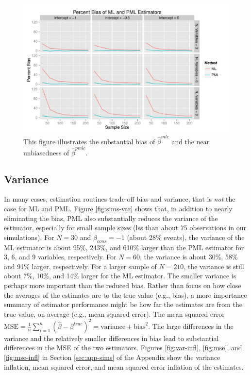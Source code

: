 \documentclass[12pt]{article}
\begin{document}
\begin{figure}[h]
\begin{center}
\includegraphics[width = \textwidth]{figs/sims-percent-bias.pdf}
\caption{This figure illustrates the substantial bias of $\hat{\beta}^{mle}$ and the near unbiasedness of $\hat{\beta}^{pmle}$.}\label{fig:sims-coef-perc-bias}
\end{center}
\end{figure}

\subsection*{Variance}

In many cases, estimation routines trade-off bias and variance, that is \textit{not} the case for ML and PML. 
Figure \ref{fig:sims-var} shows that, in addition to nearly eliminating the bias, PML also substantially reduces the variance of the estimator, especially for small sample sizes (lss than about 75 observations in our simulations). 
For $N = 30$ and $\beta_{cons} = -1$ (about 28\% events), the variance of the ML estimator is about 95\%, 243\%, and 610\% larger than the PML estimator for 3, 6, and 9 variables, respectively. 
For $N = 60$, the variance is about 30\%, 58\% and 91\% larger, respectively. For a larger sample of $N = 210$, the variance is still about 7\%, 10\%, and 14\% larger for the ML estimator. 
The smaller variance is perhaps more important than the reduced bias.
Rather than focus on how close the averages of the estimates are to the true value (e.g., bias), a more importance summary of estimator performance might be how far the estimates are from the true value, on average (e.g., mean squared error).
The mean squared error $\text{MSE} = \frac{1}{n}\sum_{i=1}^n(\hat{\beta} - \beta^{true})^2 = \text{variance} + \text{bias}^2$.
The large differences in the variance and the relatively smaller differences in bias lead to substantial differences in the MSE of the two estimators.
Figures \ref{fig:var-infl}, \ref{fig:mse}, and \ref{fig:mse-infl} in Section \ref{sec:app-sims} of the Appendix show the variance inflation, mean squared error, and mean squared error inflation of the estimates.
\end{document}
